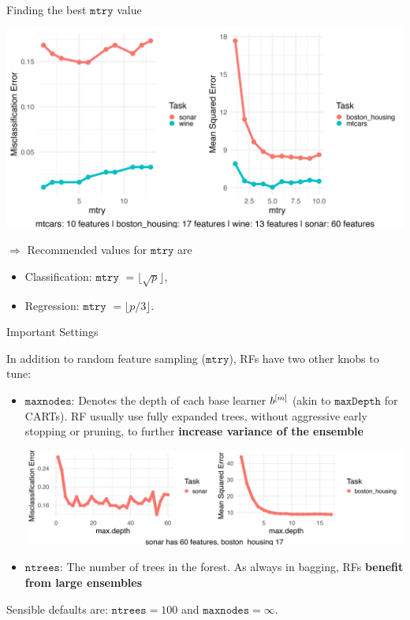 \documentclass[11pt,compress,t,notes=noshow, xcolor=table]{beamer}
\begin{document}
\begin{vbframe}{Finding the best $\texttt{mtry}$ value}

\begin{center}
\includegraphics[width=1\textwidth]{figure/forest-mtry.png}
\end{center}

$\Rightarrow$ Recommended values for $\texttt{mtry}$ are

\begin{itemize}
  \item Classification: $\texttt{mtry}$ $ = \lfloor \sqrt{p} \rfloor$,
  \item Regression: $\texttt{mtry}$ $ = \lfloor p/3 \rfloor$.
\end{itemize}

\end{vbframe}

\begin{vbframe}{Important Settings}

In addition to random feature sampling ($\texttt{mtry}$), RFs have two other knobs to tune:

\begin{itemize}
  \item $\texttt{maxnodes}$: Denotes the depth of each base learner $b^{[m]}$ (akin to $\texttt{maxDepth}$ for CARTs). RF usually use fully expanded trees, without aggressive early stopping or pruning, to further \textbf{increase variance of the ensemble} 
\begin{center}
\includegraphics[width=1\textwidth]{figure/forest-maxdepth.png}
\end{center}
  \item $\texttt{ntrees}$: The number of trees in the forest. As always in bagging, RFs \textbf{benefit from large ensembles} 
\end{itemize}

Sensible defaults are: $\texttt{ntrees} = 100$ and $\texttt{maxnodes} = \infty$.

\end{vbframe}
\end{document}
